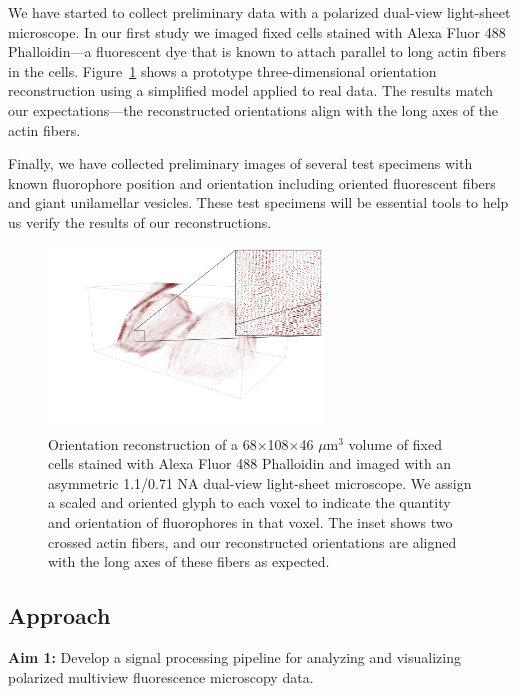 \documentclass[11pt]{article}
\begin{document}
We have started to collect preliminary data with a polarized dual-view
light-sheet microscope. In our first study we imaged fixed cells stained with
Alexa Fluor 488 Phalloidin---a fluorescent dye that is known to attach parallel
to long actin fibers in the cells.  Figure~\ref{fig:recon} shows a prototype
three-dimensional orientation reconstruction using a simplified model applied to
real data. The results match our expectations---the reconstructed orientations
align with the long axes of the actin fibers.

Finally, we have collected preliminary images of several test specimens with
known fluorophore position and orientation including oriented fluorescent fibers
and giant unilamellar vesicles. These test specimens will be essential tools to
help us verify the results of our reconstructions.

\begin{figure}[t]
\centering
  \includegraphics[width=0.65\textwidth, interpolate=true, trim={6em 4em 2em 0em}]{figs/inset}
  \caption{Orientation reconstruction of a 68$\times$108$\times$46 $\mu$m${}^3$
    volume of fixed cells stained with Alexa Fluor 488 Phalloidin and imaged
    with an asymmetric 1.1/0.71 NA dual-view light-sheet microscope. We assign a
    scaled and oriented glyph to each voxel to indicate the quantity and
    orientation of fluorophores in that voxel. The inset shows two crossed actin
    fibers, and our reconstructed orientations are aligned with the long axes of these
    fibers as expected.}
  \label{fig:recon}
\end{figure}


\subsection*{Approach}
\noindent\textbf{Aim 1:} Develop a signal processing pipeline for analyzing and
  visualizing polarized multiview fluorescence microscopy data.
\end{document}

